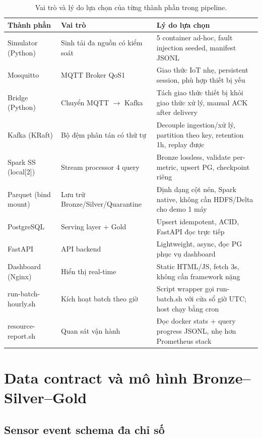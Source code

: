 \begin{table}[H]
\centering
\caption{Vai trò và lý do lựa chọn của từng thành phần trong pipeline.}
\label{tab:components}
\begin{tabularx}{\textwidth}{l l X}
\toprule
\textbf{Thành phần} & \textbf{Vai trò} & \textbf{Lý do lựa chọn} \\
\midrule
Simulator (Python) & Sinh tải đa nguồn có kiểm soát & 5 container ad-hoc, fault injection seeded, manifest JSONL \\
Mosquitto & MQTT Broker QoS1 & Giao thức IoT nhẹ, persistent session, phù hợp thiết bị yếu \\
Bridge (Python) & Chuyển MQTT $\rightarrow$ Kafka & Tách giao thức thiết bị khỏi giao thức xử lý, manual ACK after delivery \\
Kafka (KRaft) & Bộ đệm phân tán có thứ tự & Decouple ingestion/xử lý, partition theo key, retention 1h, replay được \\
Spark SS (local{[}2{]}) & Stream processor 4 query & Bronze lossless, validate per-metric, upsert PG, checkpoint riêng \\
Parquet (bind mount) & Lưu trữ Bronze/Silver/Quarantine & Định dạng cột nén, Spark native, không cần HDFS/Delta cho demo 1 máy \\
PostgreSQL & Serving layer + Gold & Upsert idempotent, ACID, FastAPI đọc trực tiếp \\
FastAPI & API backend & Lightweight, async, đọc PG phục vụ dashboard \\
Dashboard (Nginx) & Hiển thị real-time & Static HTML/JS, fetch 3s, không cần framework nặng \\
run-batch-hourly.sh & Kích hoạt batch theo giờ & Script wrapper gọi run-batch.sh với cửa sổ giờ UTC; host chạy bằng cron \\
resource-report.sh & Quan sát vận hành & Đọc docker stats + query progress JSONL, nhẹ hơn Prometheus stack \\
\bottomrule
\end{tabularx}
\end{table}

\section{Data contract và mô hình Bronze--Silver--Gold}
\label{subsec:data-contract}

\subsection{Sensor event schema đa chỉ số}

